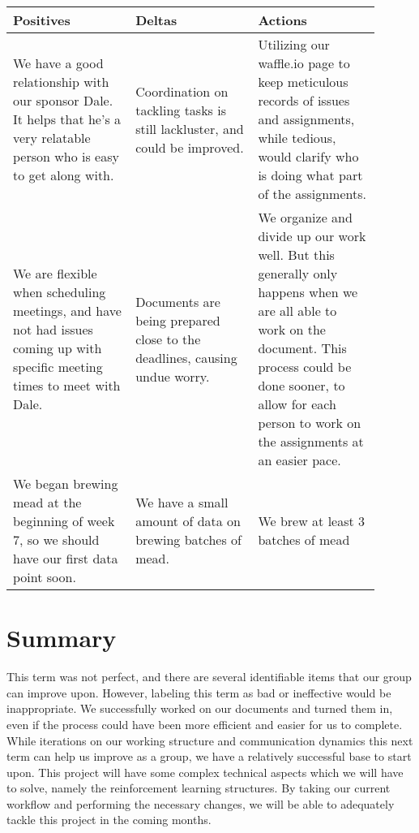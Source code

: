 \documentclass[draftclsnofoot,onecolumn,letterpaper,10pt]{IEEEtran}
\begin{document}
\begin{center}
	\begin{tabular}{p{0.3\linewidth} p{0.3\linewidth} p{0.3\linewidth}}
		\toprule
		\textbf{Positives} & \textbf{Deltas} & \textbf{Actions} \\
		\midrule
		We have a good relationship with our sponsor Dale. It helps that he's a very relatable person who is easy to get along with. & Coordination on tackling tasks is still lackluster, and could be improved. & Utilizing our waffle.io page to keep meticulous records of issues and assignments, while tedious, would clarify who is doing what part of the assignments.\\
		We are flexible when scheduling meetings, and have not had issues coming up with specific meeting times to meet with Dale.& Documents are being prepared close to the deadlines, causing undue worry.& We organize and divide up our work well. But this generally only happens when we are all able to work on the document. This process could be done sooner, to allow for each person to work on the assignments at an easier pace.\\
		We began brewing mead at the beginning of week 7, so we should have our first data point soon. & We have a small amount of data on brewing batches of mead. & We brew at least 3 batches of mead \\
		
		\bottomrule
	\end{tabular}
\end{center}


%
%

\section{Summary}
This term was not perfect, and there are several identifiable items that our group can improve upon.
However, labeling this term as bad or ineffective would be inappropriate.
We successfully worked on our documents and turned them in, even if the process could have been more efficient and easier for us to complete.
While iterations on our working structure and communication dynamics this next term can help us improve as a group, we have a relatively successful base to start upon.
This project will have some complex technical aspects which we will have to solve, namely the reinforcement learning structures.
By taking our current workflow and performing the necessary changes, we will be able to adequately tackle this project in the coming months.
\end{document}

